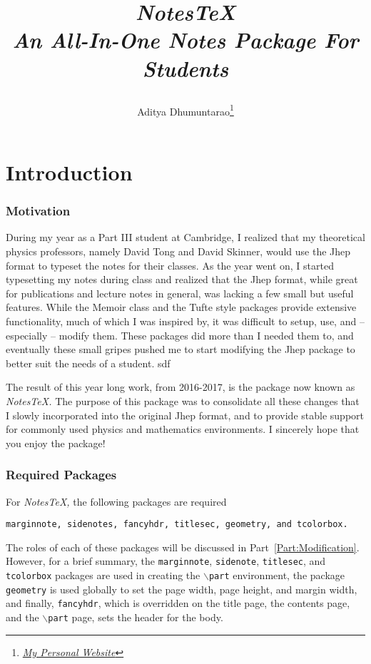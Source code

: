 \documentclass[10pt]{article}
\title{\begin{center}{\Huge \textit{NotesTeX}}\\{{\itshape An All-In-One Notes Package For Students}}\end{center}}
\author{Aditya Dhumuntarao\footnote{\href{https://geodesick.com/}{\textit{My Personal Website}}}}
\affiliation{
DAMTP, University of Cambridge\\
Perimeter Institute of Theoretical Physics\\
University of Minnesota
}
\begin{document}
	\maketitle
	\flushbottom
	\newpage
	\pagestyle{fancynotes}
	\part{Introduction}	
	\section{Motivation}\label{Sec:Motivation}
	During my year as a Part III student at Cambridge, I realized that my theoretical physics professors, namely David Tong and David Skinner, would use the Jhep format to typeset the notes for their classes. As the year went on, I started typesetting my notes during class and realized that the Jhep format, while great for publications and lecture notes in general, was lacking a few small but useful features. While the Memoir class and the Tufte style packages provide extensive functionality, much of which I was inspired by, it was difficult to setup, use, and -- especially -- modify them. These packages did more than I needed them to, and eventually these small gripes pushed me to start modifying the Jhep package to better suit the needs of a student. sdf

	The result of this year long work, from 2016-2017, is the package now known as \textit{NotesTeX.} The purpose of this package was to consolidate all these changes that I slowly incorporated into the original Jhep format, and to provide stable support for commonly used physics and mathematics environments. I sincerely hope that you enjoy the package!


	\section{Required Packages}\label{Sec: Required Packages}
	For \textit{NotesTeX,} the following packages are required
	\begin{center}
		\texttt{marginnote, sidenotes, fancyhdr, titlesec, geometry, and tcolorbox.}
	\end{center}
	The roles of each of these packages will be discussed in Part~\ref{Part:Modification}. However, for a brief summary, the \texttt{marginnote}, \texttt{sidenote}, \texttt{titlesec}, and \texttt{tcolorbox} packages are used in creating the \texttt{$\backslash$part} environment, the package \texttt{geometry} is used globally to set the page width, page height, and margin width, and finally, \texttt{fancyhdr}, which is overridden on the title page, the contents page, and the \texttt{$\backslash$part} page, sets the header for the body.
\end{document}
